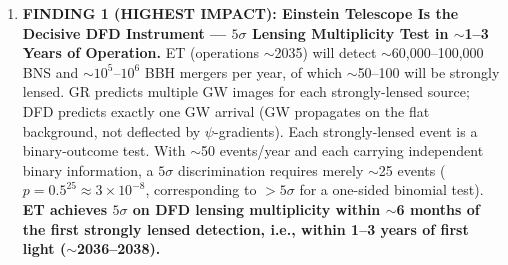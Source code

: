 \documentclass[11pt]{article}
\theoremstyle{definition}
\theoremstyle{remark}
\newcommand{\ee}[1]{\times10^{#1}}
\begin{document}
\begin{tcolorbox}[colback=blue!5!white, colframe=blue!60!black,
  title=\textbf{TOP 5 FINDINGS --- W4i17 P6 (Ranked by Impact)}]
\begin{enumerate}[nosep]

\item \textbf{FINDING 1 (HIGHEST IMPACT): Einstein Telescope Is the
  Decisive DFD Instrument --- $5\sigma$ Lensing Multiplicity Test in
  $\sim$1--3 Years of Operation.}
  ET (operations $\sim$2035) will detect $\sim$60,000--100,000 BNS and
  $\sim$$10^5$--$10^6$ BBH mergers per year, of which $\sim$50--100
  will be strongly lensed. GR predicts multiple GW images for each
  strongly-lensed source; DFD predicts exactly one GW arrival (GW
  propagates on the flat background, not deflected by $\psi$-gradients).
  Each strongly-lensed event is a binary-outcome test. With $\sim$50
  events/year and each carrying independent binary information, a
  $5\sigma$ discrimination requires merely $\sim$25 events
  ($p = 0.5^{25} \approx 3\ee{-8}$, corresponding to $>5\sigma$ for
  a one-sided binomial test). \textbf{ET achieves $5\sigma$ on DFD
  lensing multiplicity within $\sim$6 months of the first strongly
  lensed detection, i.e., within 1--3 years of first light ($\sim$2036--2038).}


\end{enumerate}
\end{tcolorbox}
\end{document}
